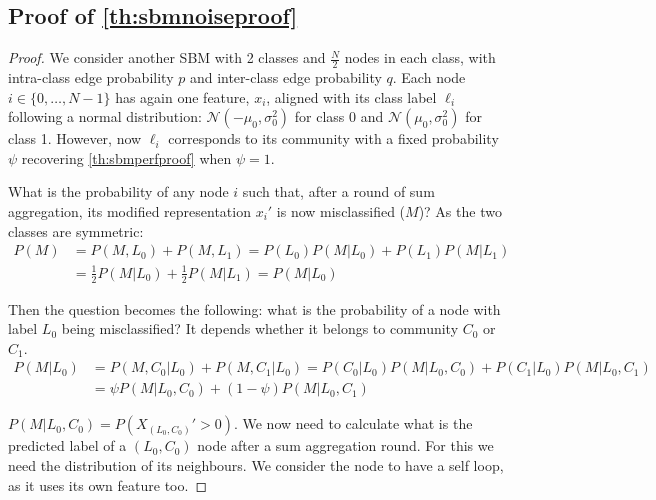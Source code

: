 \subsection{Proof of \autoref{th:sbmnoiseproof}} \label{app:sbmnoiseproof}
\begin{proof}
We consider another SBM with 2 classes and $\frac{N}{2}$ nodes in each class, with intra-class edge probability $p$ and inter-class edge probability $q$.
Each node $i\in\{0,\ldots,N-1\}$ has again one feature, $x_i$, aligned with its class label $\ell_i$ following a normal distribution: $\mathcal{N}(-\mu_0,\sigma_0^2)$ for class 0 and $\mathcal{N}(\mu_0,\sigma_0^2)$ for class 1. However, now $\ell_i$ corresponds to its community with a fixed probability $\psi$ \textemdash recovering \autoref{th:sbmperfproof} when $\psi=1$.

What is the probability of any node $i$ such that, after a round of sum aggregation, its modified representation $x_i'$ is now misclassified ($M$)? As the two classes are symmetric:
\begin{align*}
	P(M)
	&= P(M , L_0) + P(M , L_1) 
	 = P(L_0)P(M|L_0) + P(L_1)P(M|L_1) \\
	&= \frac{1}{2}P(M|L_0) + \frac{1}{2}P(M|L_1)
	= P(M|L_0)
\end{align*} 

Then the question becomes the following: what is the probability of a node with label $L_0$ being misclassified? It depends whether it belongs to community $C_0$ or $C_1$. 
\begin{align*}
	P(M|L_0)
	&= P(M, C_0|L_0) + P(M, C_1|L_0) 
	= P(C_0|L_0)P(M|L_0, C_0) + P(C_1|L_0)P(M|L_0, C_1)  \\
	&= \psi P(M|L_0, C_0) + (1-\psi)P(M|L_0, C_1)
\end{align*}

$P(M|L_0, C_0) = P(X_{(L_0,C_0)}' > 0)$. We now need to calculate what is the predicted label of a $(L_0,C_0)$ node after a sum aggregation round. For this we need the distribution of its neighbours.
We consider the node to have a self loop, as it uses its own feature too.


\end{proof}
